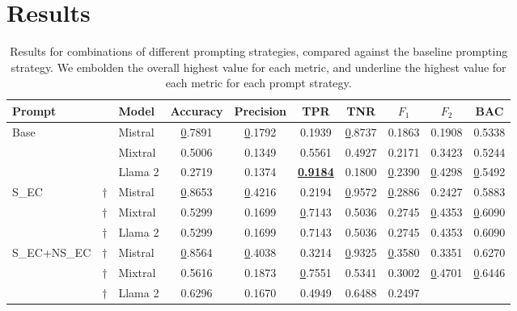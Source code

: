 \section{Results}

\begin{table*}[!h]
\centering
\caption{Results for combinations of different prompting strategies, compared against the baseline prompting strategy. We embolden the overall highest value for each metric, and underline the highest value for each metric for each prompt strategy.}
\label{table:results}
\begin{tabular}{@{}lclccccccc@{}}
\toprule
Prompt &
  &
  Model &
  Accuracy &
  Precision &
  TPR &
  TNR &
  $F_{1}$ &
  $F_{2}$ &
  BAC \\ \midrule
\multirow{3}{*}{Base} &
  &
  Mistral &
  {\ul 0.7891} &
  {\ul 0.1792} &
  0.1939 &
  {\ul 0.8737} &
  0.1863 &
  0.1908 &
  0.5338 \\
 &
  &
  Mixtral &
  0.5006 &
  0.1349 &
  0.5561 &
  0.4927 &
  0.2171 &
  0.3423 &
  0.5244 \\
 &
  &
  Llama 2 &
  0.2719 &
  0.1374 &
  {\ul \textbf{0.9184}} &
  0.1800 &
  {\ul 0.2390} &
  {\ul 0.4298} &
  {\ul 0.5492} \\ \cmidrule(l){3-10}
\multirow{3}{*}{S\_EC} &
  $\dagger$ \hspace{0.46em} &
  Mistral &
  {\ul 0.8653} &
  {\ul 0.4216} &
  0.2194 &
  {\ul 0.9572} &
  {\ul 0.2886} &
  0.2427 &
  0.5883 \\
 &
  $\dagger$ \hspace{0.46em} &
  Mixtral &
  0.5299 &
  0.1699 &
  {\ul 0.7143} &
  0.5036 &
  0.2745 &
  {\ul 0.4353} &
  {\ul 0.6090} \\
 &
  $\dagger$ \hspace{0.46em} &
  Llama 2 &
  0.5299 &
  0.1699 &
  0.7143 &
  0.5036 &
  0.2745 &
  0.4353 &
  0.6090 \\ \cmidrule(l){3-10}
\multirow{3}{*}{S\_EC+NS\_EC} &
  $\dagger$ \hspace{0.46em} &
  Mistral &
  {\ul 0.8564} &
  {\ul 0.4038} &
  0.3214 &
  {\ul 0.9325} &
  {\ul 0.3580} &
  0.3351 &
  0.6270 \\
 &
  $\dagger$ \hspace{0.46em} &
  Mixtral &
  0.5616 &
  0.1873 &
  {\ul 0.7551} &
  0.5341 &
  0.3002 &
  {\ul 0.4701} &
  {\ul 0.6446} \\
 &
  $\dagger$ \hspace{0.46em} &
  Llama 2 &
  0.6296 &
  0.1670 &
  0.4949 &
  0.6488 &
  0.2497 &

\end{tabular}
\end{table*}
